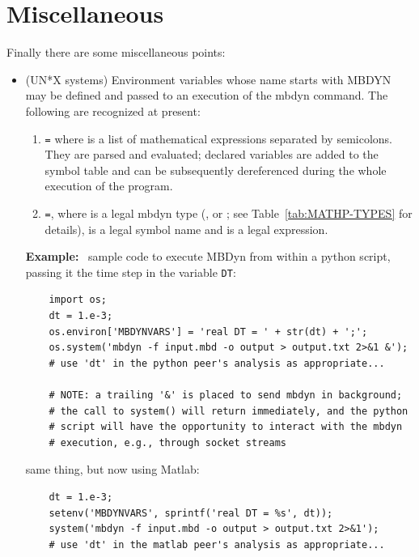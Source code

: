 \section{Miscellaneous}
Finally there are some miscellaneous points:
\begin{itemize}
    \item (UN*X systems) Environment variables whose name starts with MBDYN may
    be defined and passed to an execution of the mbdyn command.
    The following are recognized at present:
  
    \begin{enumerate}
  
        \item \texttt{=}
	where  is a list of mathematical expressions
	separated by semicolons. 
	They are parsed and evaluated; declared variables are
	added to the symbol table and can be subsequently dereferenced
	during the whole execution of the program.
    
        \item \texttt{=},
	where  is a legal mbdyn type (, 
	or ; see Table~\ref{tab:MATHP-TYPES} for details),
	 is a legal symbol name and  is a legal
	expression.
    
    \end{enumerate}

    \textbf{Example:} \
    sample code to execute MBDyn from within a python script,
    passing it the time step in the  variable \texttt{DT}:
\begin{verbatim}
    import os;
    dt = 1.e-3;
    os.environ['MBDYNVARS'] = 'real DT = ' + str(dt) + ';';
    os.system('mbdyn -f input.mbd -o output > output.txt 2>&1 &');
    # use 'dt' in the python peer's analysis as appropriate...

    # NOTE: a trailing '&' is placed to send mbdyn in background;
    # the call to system() will return immediately, and the python
    # script will have the opportunity to interact with the mbdyn
    # execution, e.g., through socket streams
\end{verbatim}

    same thing, but now using Matlab:
\begin{verbatim}
    dt = 1.e-3;
    setenv('MBDYNVARS', sprintf('real DT = %s', dt));
    system('mbdyn -f input.mbd -o output > output.txt 2>&1');
    # use 'dt' in the matlab peer's analysis as appropriate...


\end{verbatim}
\end{itemize}
